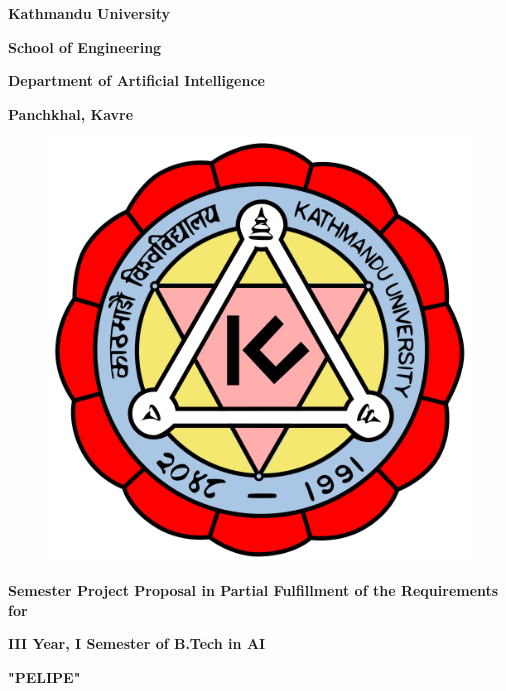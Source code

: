 \begin{titlepage}
    \thispagestyle{empty}
    \begin{center}
    
    \vspace*{\fill} %
    {\huge \textbf{Kathmandu University
}\par}\vspace{10pt}
{\Large \textbf{School of Engineering
}\par}
\vspace{10pt}
{\Large \textbf{Department of Artificial Intelligence
}\par}\vspace{10pt}
{\large \textbf{Panchkhal, Kavre
}\par}
\vspace{24pt}

\begin{figure}[ht]
    \centering
    \includegraphics[scale=0.15]{images/ku.png}
\end{figure}
\vspace{24pt}
{\large \textbf{Semester Project Proposal in Partial Fulfillment of the Requirements for
}\par}
{\large \textbf{III Year, I Semester of B.Tech in AI
}\par}
\vspace{14pt}
{\Large \textbf{ "PELIPE"}\par}


\end{center}
\end{titlepage}
